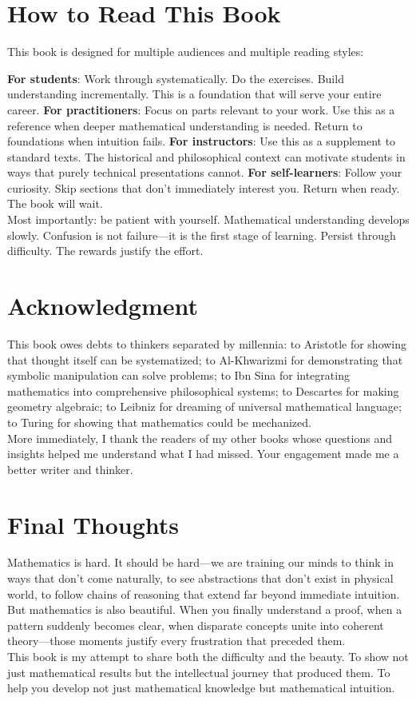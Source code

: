 \section*{How to Read This Book}

This book is designed for multiple audiences and multiple reading styles:

\textbf{For students}: Work through systematically. Do the exercises. Build understanding incrementally. This is a foundation that will serve your entire career.
\textbf{For practitioners}: Focus on parts relevant to your work. Use this as a reference when deeper mathematical understanding is needed. Return to foundations when intuition fails.
\textbf{For instructors}: Use this as a supplement to standard texts. The historical and philosophical context can motivate students in ways that purely technical presentations cannot.
\textbf{For self-learners}: Follow your curiosity. Skip sections that don't immediately interest you. Return when ready. The book will wait.\\
Most importantly: be patient with yourself. Mathematical understanding develops slowly. Confusion is not failure—it is the first stage of learning. Persist through difficulty. The rewards justify the effort.

\section*{Acknowledgment}

This book owes debts to thinkers separated by millennia: to Aristotle for showing that thought itself can be systematized; to Al-Khwarizmi for demonstrating that symbolic manipulation can solve problems; to Ibn Sina for integrating mathematics into comprehensive philosophical systems; to Descartes for making geometry algebraic; to Leibniz for dreaming of universal mathematical language; to Turing for showing that mathematics could be mechanized.\\
More immediately, I thank the readers of my other books whose questions and insights helped me understand what I had missed. Your engagement made me a better writer and thinker.

\section*{Final Thoughts}

Mathematics is hard. It should be hard—we are training our minds to think in ways that don't come naturally, to see abstractions that don't exist in physical world, to follow chains of reasoning that extend far beyond immediate intuition.\\
But mathematics is also beautiful. When you finally understand a proof, when a pattern suddenly becomes clear, when disparate concepts unite into coherent theory—those moments justify every frustration that preceded them.\\
This book is my attempt to share both the difficulty and the beauty. To show not just mathematical results but the intellectual journey that produced them. To help you develop not just mathematical knowledge but mathematical intuition.\\


